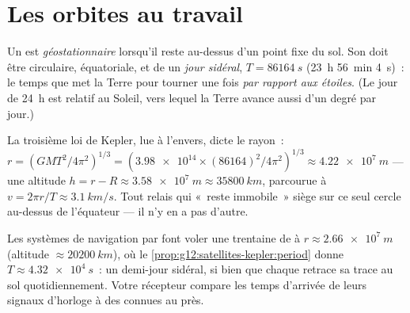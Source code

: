 \section{Les orbites au travail}

\begin{definition}\label{def:g12:satellites-kepler:geo}
Un  est \emph{géostationnaire} lorsqu'il reste au-dessus d'un point fixe du sol. Son
 doit être circulaire, équatoriale, et de
 un \emph{jour sidéral},
$T = \qty{86164}{s}$ (\qty{23}{h} \qty{56}{min} \qty{4}{s})~: le temps
que met la Terre pour tourner une fois \emph{par rapport aux étoiles}.
(Le jour de \qty{24}{h} est relatif au Soleil, vers lequel la Terre
avance aussi d'un degré par jour.)
\end{definition}

\begin{example}\label{ex:g12:satellites-kepler:geoalt}
La troisième loi de Kepler, lue à l'envers, dicte le rayon~:
$r = \left(GMT^2/4\pi^2\right)^{1/3} =
\left(\num{3.98e14} \times (\num{86164})^2/4\pi^2\right)^{1/3}
\approx \qty{4.22e7}{m}$ --- une altitude $h = r - R \approx
\qty{3.58e7}{m} \approx \qty{35800}{km}$, parcourue à $v = 2\pi r/T
\approx \qty{3.1}{km/s}$. Tout relais qui «~reste immobile~» siège sur
ce seul cercle au-dessus de l'équateur --- il n'y en a pas d'autre.
\end{example}

\begin{example}\label{ex:g12:satellites-kepler:gps}
Les systèmes de navigation par  font voler une trentaine de
 à $r \approx \qty{2.66e7}{m}$ (altitude
$\approx \qty{20200}{km}$), où le \cref{prop:g12:satellites-kepler:period}
donne $T \approx \qty{4.32e4}{s}$~: un demi-jour sidéral,
si bien que chaque  retrace sa trace au sol
quotidiennement. Votre récepteur compare les temps d'arrivée de leurs
signaux d'horloge à des  connues
au  près.
\end{example}

